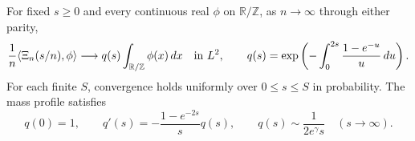\documentclass[11pt,letterpaper]{article}
\newcommand{\T}{\mathbb R/\mathbb Z}\newcommand{\Leb}{\operatorname{Leb}}
\begin{document}
\begin{theorem}
\label{thm:early-fluid}
For fixed $s\ge0$ and every continuous real $\phi$ on $\T$, as $n\to\infty$
through either parity,
\begin{equation}\label{eq:early-fluid}
 \frac1n\langle\Xi_n(s/n),\phi\rangle
 \longrightarrow q(s)\int_{\T}\phi(x)\,dx\quad\hbox{in }L^2,
 \qquad
 q(s)=\exp\left(-\int_0^{2s}\frac{1-e^{-u}}u\,du\right).
\end{equation}
For each finite $S$, convergence holds uniformly over $0\le s\le S$ in
probability. The mass profile satisfies
\begin{equation}\label{eq:fluid-ode}
 q(0)=1,\qquad q'(s)=-\frac{1-e^{-2s}}s q(s),\qquad
 q(s)\sim\frac1{2e^\gamma s}\quad(s\to\infty).
\end{equation}
\end{theorem}
\end{document}
